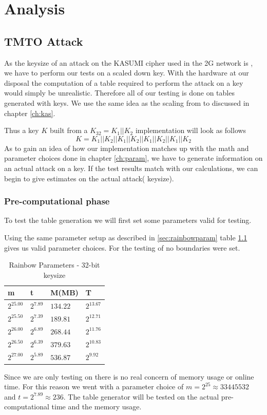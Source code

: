 \chapter{Analysis}
\label{ch:anal}

\section{TMTO Attack}
As the keysize of an attack on the KASUMI cipher used in the 2G
network is , we have to perform our tests on a scaled down
key. With the hardware at our disposal the computation of a table
required to perform the attack on a  key would simply be
unrealistic. Therefore all of our testing is done on tables generated
with  keys. We use the same idea as the scaling from  to
 discussed in chapter \ref{ch:kas}.

Thus a key $K$ built from a  $K_{32} = K_1 || K_2$  implementation will
look as follows
\[K = K_1 || K_2 || K_1 || K_2 || K_1 || K_2 || K_1 || K_2\]
As to gain an idea of how our implementation matches up with
the math and parameter choices done in chapter \ref{ch:param}, we have to generate
information on an actual attack on a  key. If the  test
results match with our calculations, we can begin to give estimates
on the actual attack( keysize).
\subsection{Pre-computational phase}
To test the table generation we will first set some parameters
valid for  testing.

Using the same parameter setup as described in \ref{sec:rainbowparam}
table \ref{tab:rainparam32} gives us valid parameter choices. For the
testing of  no boundaries were set.
\begin{table}[H]
  \centering
  \begin{tabular}{llll}
    m & t & M(MB) & T \\ \hline
    $2^{25.00}$ & $2^{7.89}$ & $134.22$ & $2^{13.67}$ \\
    $2^{25.50}$ & $2^{7.39}$ & $189.81$ & $2^{12.71}$ \\
    $2^{26.00}$ & $2^{6.89}$ & $268.44$ & $2^{11.76}$ \\
    $2^{26.50}$ & $2^{6.39}$ & $379.63$ & $2^{10.83}$ \\
    $2^{27.00}$ & $2^{5.89}$ & $536.87$ & $2^{9.92}$ \\
  \end{tabular}
  \caption{Rainbow Parameters - 32-bit keysize}
  \label{tab:rainparam32}
\end{table}
Since we are only testing on  there is no real concern of
memory usage or online time. For this reason we went with a parameter
choice of $m=2^{25} \approx 33445532$ and $t= 2^{7.89} \approx
236$. The table generator will be tested on the actual
pre-computational time and the memory usage.
